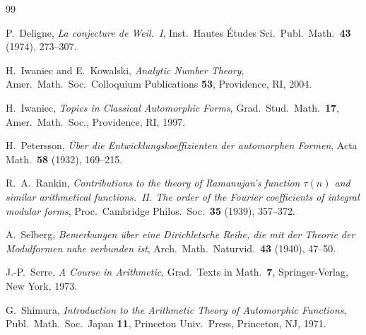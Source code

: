 \documentclass[11pt]{amsart}
\theoremstyle{definition}
\theoremstyle{remark}
\numberwithin{equation}{section}
\begin{document}
\begin{thebibliography}{99}

P.~Deligne,
\textit{La conjecture de Weil.~I},
Inst.\ Hautes \'Etudes Sci.\ Publ.\ Math.\ \textbf{43} (1974), 273--307.

H.~Iwaniec and E.~Kowalski,
\textit{Analytic Number Theory},
Amer.\ Math.\ Soc.\ Colloquium Publications \textbf{53}, Providence, RI, 2004.

H.~Iwaniec,
\textit{Topics in Classical Automorphic Forms},
Grad.\ Stud.\ Math.\ \textbf{17}, Amer.\ Math.\ Soc., Providence, RI, 1997.

H.~Petersson,
\textit{\"Uber die Entwicklungskoeffizienten der automorphen Formen},
Acta Math.\ \textbf{58} (1932), 169--215.

R.~A.~Rankin,
\textit{Contributions to the theory of Ramanujan's function $\tau(n)$ and similar arithmetical functions.~II. The order of the Fourier coefficients of integral modular forms},
Proc.\ Cambridge Philos.\ Soc.\ \textbf{35} (1939), 357--372.

A.~Selberg,
\textit{Bemerkungen \"uber eine Dirichletsche Reihe, die mit der Theorie der Modulformen nahe verbunden ist},
Arch.\ Math.\ Naturvid.\ \textbf{43} (1940), 47--50.

J.-P.~Serre,
\textit{A Course in Arithmetic},
Grad.\ Texts in Math.\ \textbf{7}, Springer-Verlag, New York, 1973.

G.~Shimura,
\textit{Introduction to the Arithmetic Theory of Automorphic Functions},
Publ.\ Math.\ Soc.\ Japan \textbf{11}, Princeton Univ.\ Press, Princeton, NJ, 1971.

\end{thebibliography}
\end{document}
